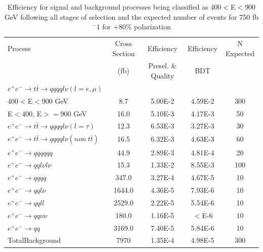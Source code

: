 \begin{table}
  \centering
  \begin{tabular}{l | c | c | c | c}
    \toprule
    Process     & Cross Section & Efficiency & Efficiency & N Expected\\
         & (fb) & Presel. \& Quality & BDT & \\
    \midrule
    $e^+e^-\rightarrow t\bar{t} \rightarrow qqqql\nu (l=e,\mu)$ &  & \\
    400$<$E$<$900 GeV & 8.7 & 5.00E-2 & 4.59E-2 & 300\\
    E$<$400, E$>=$900 GeV & 16.0 & 5.10E-3 & 4.17E-3 & 50\\
   \midrule
    $e^+e^-\rightarrow t\bar{t} \rightarrow qqqql\nu (l=\tau)$& 12.3 & 6.53E-3 & 3.27E-3 & 30\\
    \midrule
    $e^+e^-\rightarrow t\bar{t} \rightarrow qqqql\nu (non ~ t\bar{t})$& 16.5 & 6.32E-3 & 4.63E-3 & 60\\
    \midrule
    $e^+e^-\rightarrow qqqqqq$ & 44.9 & 2.89E-3 & 4.81E-4 & 20 \\
    \midrule
    $e^+e^-\rightarrow qql\nu l\nu$ & 15.3  & 1.33E-2 & 8.55E-3 & 100 \\
    \midrule
    $e^+e^-\rightarrow qqqq$ & 347.0 & 3.27E-4 & 4.67E-5 & 10 \\
    \midrule
    $e^+e^-\rightarrow qql\nu$ & 1644.0 & 4.36E-5 & 7.93E-6 & 10\\
    \midrule
    $e^+e^-\rightarrow qqll$ & 2529.0 & 2.22E-5 & 5.54E-6 & 10 \\
    \midrule
    $e^+e^-\rightarrow qq\nu\nu$ & 180.0 & 1.16E-5 & $<$E-6 & 10 \\
    \midrule
    $e^+e^-\rightarrow qq$ & 3169.0 & 7.40E-5 & 5.84E-6 & 10 \\
    \midrule
    \midrule
    TotalBackground & 7970 & 1.35E-4 & 4.98E-5 & 300\\
    \bottomrule
  \end{tabular}
  \caption{Efficiency for signal and background processes being classified as 400$<$E$<$900 GeV following all stages of selection and the expected number of events for 750 fb$^-1$ for +80\% polarization}
  \label{table:topfinalefficienciesposLowE}
\end{table}


